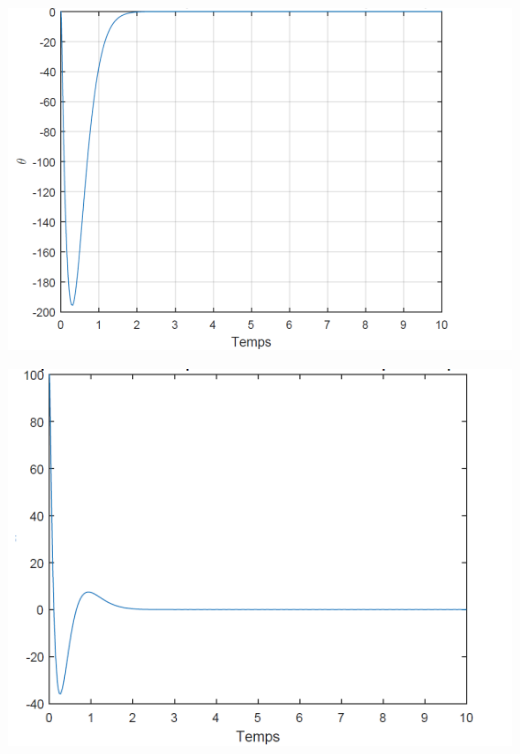 \documentclass[12pt, a4paper, openany]{report}
\begin{document}
\begin{center}
{\includegraphics[scale=0.6]{fig6.png}}
\label{fiig6} 
\quad


{\includegraphics[scale=0.6]{fig7.png}}
\label{fiig7}
\end{center}  
\end{document}
